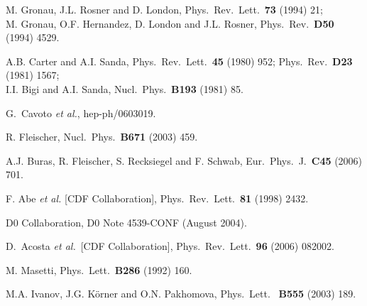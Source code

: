 \documentclass[11pt]{cernrep}
\begin{document}
\begin{thebibliography}{999}
M. Gronau, J.L. Rosner and D. London,
  { Phys.\ Rev.\ Lett.}~{\bf 73} (1994) 21;\\
 M. Gronau, O.F. Hernandez, D. London and J.L. Rosner,
  { Phys.\ Rev.}~{\bf D50} (1994) 4529.
  
A.B. Carter and A.I. Sanda,
{ Phys.\ Rev.\ Lett.}~{\bf 45} (1980) 952;
{ Phys.\ Rev.}~{\bf D23} (1981) 1567;\\
I.I. Bigi and A.I. Sanda,
{ Nucl.\ Phys.}~{\bf B193} (1981) 85.

G.~Cavoto {\it et al.},
  hep-ph/0603019.
  
R. Fleischer,
 {  Nucl.\ Phys.}~{\bf B671} (2003) 459.

A.J. Buras, R. Fleischer, S. Recksiegel and F. Schwab,
  Eur.\ Phys.\ J.\  {\bf C45} (2006) 701.
  
F. Abe {\it et al.}  [CDF Collaboration],
{ Phys.\ Rev.\ Lett.}~{\bf 81} (1998) 2432.

D0 Collaboration, D0 Note 4539-CONF (August 2004).

D.~Acosta {\it et al.}\  [CDF Collaboration],
  Phys.\ Rev.\ Lett.\  {\bf 96} (2006) 082002.

M. Masetti, { Phys.\ Lett.}~{\bf B286} (1992) 160.

M.A. Ivanov, J.G. K\"orner and O.N. Pakhomova,
{ Phys.\ Lett.}~ {\bf B555} (2003) 189.


\end{thebibliography}
\end{document}
